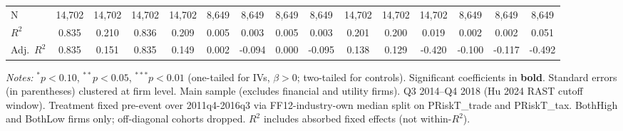 \begin{landscape}
\begin{table}[H]
\begin{tabular}{lcccccccccccccc}
N & 14,702 & 14,702 & 14,702 & 14,702 & 8,649 & 8,649 & 8,649 & 8,649 & 14,702 & 14,702 & 14,702 & 8,649 & 8,649 & 8,649 \\
$R^2$ & 0.835 & 0.210 & 0.836 & 0.209 & 0.005 & 0.003 & 0.005 & 0.003 & 0.201 & 0.200 & 0.019 & 0.002 & 0.002 & 0.051 \\
Adj.~$R^2$ & 0.835 & 0.151 & 0.835 & 0.149 & 0.002 & -0.094 & 0.000 & -0.095 & 0.138 & 0.129 & -0.420 & -0.100 & -0.117 & -0.492 \\
\bottomrule
\end{tabular}
\begin{minipage}{\linewidth}
\vspace{2pt}\scriptsize
\textit{Notes:} $^{*}p<0.10$, $^{**}p<0.05$, $^{***}p<0.01$ (one-tailed for IVs, $\beta > 0$; two-tailed for controls).
 Significant coefficients in \textbf{bold}.
 Standard errors (in parentheses) clustered at firm level.
 Main sample (excludes financial and utility firms). Q3 2014--Q4 2018 (Hu 2024 RAST cutoff window). Treatment fixed pre-event over 2011q4-2016q3 via FF12-industry-own median split on PRiskT\_trade and PRiskT\_tax. BothHigh and BothLow firms only; off-diagonal cohorts dropped.
 $R^2$ includes absorbed fixed effects (not within-$R^2$).
\end{minipage}
\end{table}
\end{landscape}